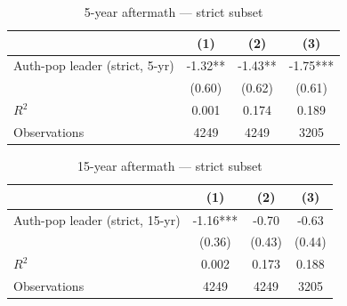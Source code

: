 \begin{table}[htbp]\centering
\def\sym#1{\ifmmode^{#1}\else\(^{#1}\)\fi}
\caption{5-year aftermath — strict subset}
\begin{tabular}{l*{3}{c}}
\hline\hline
                    &\multicolumn{1}{c}{(1)}   &\multicolumn{1}{c}{(2)}   &\multicolumn{1}{c}{(3)}   \\
\hline
Auth-pop leader (strict, 5-yr)&       -1.32** &       -1.43** &       -1.75***\\
                    &      (0.60)   &      (0.62)   &      (0.61)   \\
\hline
\(R^{2}\)           &       0.001   &       0.174   &       0.189   \\
Observations        &        4249   &        4249   &        3205   \\
\hline\hline
\end{tabular}
\end{table}
\begin{table}[htbp]\centering
\def\sym#1{\ifmmode^{#1}\else\(^{#1}\)\fi}
\caption{15-year aftermath — strict subset}
\begin{tabular}{l*{3}{c}}
\hline\hline
                    &\multicolumn{1}{c}{(1)}   &\multicolumn{1}{c}{(2)}   &\multicolumn{1}{c}{(3)}   \\
\hline
Auth-pop leader (strict, 15-yr)&       -1.16***&       -0.70   &       -0.63   \\
                    &      (0.36)   &      (0.43)   &      (0.44)   \\
\hline
\(R^{2}\)           &       0.002   &       0.173   &       0.188   \\
Observations        &        4249   &        4249   &        3205   \\
\hline\hline
\end{tabular}
\end{table}
